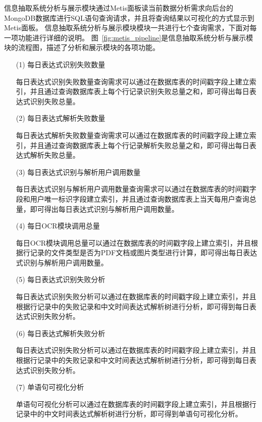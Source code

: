 信息抽取系统分析与展示模块通过Metis面板读当前数据分析需求向后台的MongoDB数据库进行SQL语句查询请求，并且将查询结果以可视化的方式显示到Metis面板。
信息抽取系统分析与展示模块模块一共进行七个查询需求，下面对每一项功能进行详细的说明。
图~\ref{fig:metis_pipeline}是信息抽取系统分析与展示模块的流程图，描述了分析和展示模块的各项功能。



\begin{enumerate}
  \item[(1)] 每日表达式识别失败数量

    每日表达式识别失败数量查询需求可以通过在数据库表的时间戳字段上建立索引，并且通过查询数据库表上每个行记录识别失败总量之和，即可得出每日表达式识别失败总量。

  \item[(2)] 每日表达式解析失败数量

    每日表达式解析失败数量查询需求可以通过在数据库表的时间戳字段上建立索引，并且通过查询数据库表上每个行记录解析失败总量之和，即可得出每日表达式解析失败总量。

  \item[(3)] 每日表达式识别与解析用户调用数量

    每日表达式识别与解析用户调用数量查询需求可以通过在数据库表的时间戳字段和用户唯一标识字段建立索引，并且通过查询数据库表上当天每用户查询总量，即可得出每日表达式识别与解析用户调用数量。

  \item[(4)] 每日OCR模块调用总量

    每日OCR模块调用总量可以通过在数据库表的时间戳字段上建立索引，并且根据行记录的文件类型是否为PDF文档或图片类型进行计算，即可得出每日表达式识别与解析用户调用数量。

  \item[(5)] 每日表达式识别失败分析

    每日表达式识别失败分析可以通过在数据库表的时间戳字段上建立索引，并且根据行记录中的失败记录和中文时间表达式解析树进行分析，即可得到每日表达式识别失败分析。

  \item[(6)] 每日表达式解析失败分析

    每日表达式识别失败分析可以通过在数据库表的时间戳字段上建立索引，并且根据行记录中的失败记录和中文时间表达式解析树进行分析，即可得到每日表达式识别失败分析。

  \item[(7)] 单语句可视化分析

    单语句可视化分析可以通过在数据库表的时间戳字段上建立索引，并且根据行记录中的中文时间表达式解析树进行分析，即可得到单语句可视化分析。
\end{enumerate}

